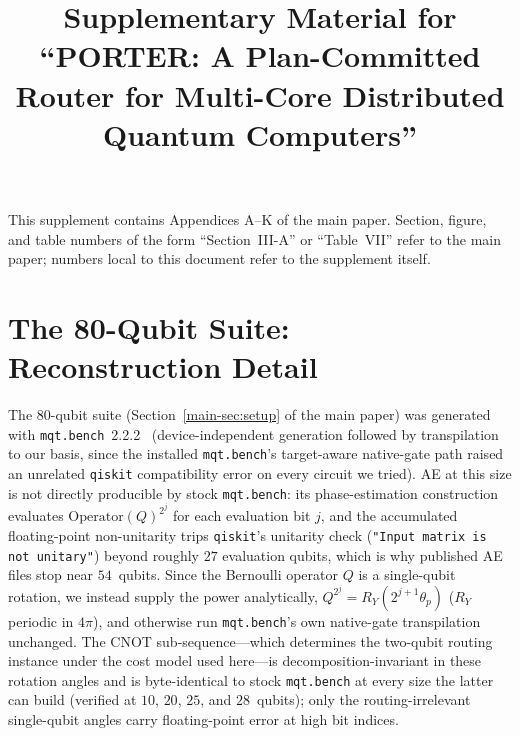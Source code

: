 \documentclass[journal]{IEEEtran}
\newcommand{\mainSetup}{Section~\ref{main-sec:setup}}
\begin{document}
\title{Supplementary Material for\\
  ``PORTER: A Plan-Committed Router for Multi-Core Distributed Quantum
  Computers''}


\maketitle

\noindent
This supplement contains Appendices A--K of the main paper. Section,
figure, and table numbers of the form ``Section~III-A'' or
``Table~VII'' refer to the main paper; numbers local to this document
refer to the supplement itself.

\appendices

\section{The 80-Qubit Suite: Reconstruction Detail}
\label{app:suite80}

The 80-qubit suite (\mainSetup{} of the main paper) was generated with
\texttt{mqt.bench}~2.2.2~\cite{quetschlich2023mqtbench}
(device-independent generation followed by
transpilation to our basis, since the installed \texttt{mqt.bench}'s
target-aware native-gate path raised an unrelated \texttt{qiskit}
compatibility error on every circuit we tried). AE at this size is not
directly producible by stock \texttt{mqt.bench}: its phase-estimation
construction evaluates $\mathrm{Operator}(Q)^{2^{j}}$ for each
evaluation bit $j$, and the accumulated floating-point non-unitarity
trips \texttt{qiskit}'s unitarity check
(\texttt{"Input matrix is not unitary"}) beyond roughly $27$ evaluation
qubits, which is why published AE files stop near $54$~qubits. Since the
Bernoulli operator $Q$ is a single-qubit rotation, we instead supply the
power analytically, $Q^{2^{j}}=R_Y(2^{j+1}\theta_p)$ ($R_Y$ periodic in
$4\pi$), and otherwise run \texttt{mqt.bench}'s own native-gate
transpilation unchanged. The CNOT sub-sequence---which determines the two-qubit routing
instance under the cost model used here---is decomposition-invariant in
these rotation angles and is byte-identical to stock \texttt{mqt.bench} at every size the latter can
build (verified at $10$, $20$, $25$, and $28$~qubits); only the
routing-irrelevant single-qubit angles carry floating-point error at
high bit indices.
\end{document}
